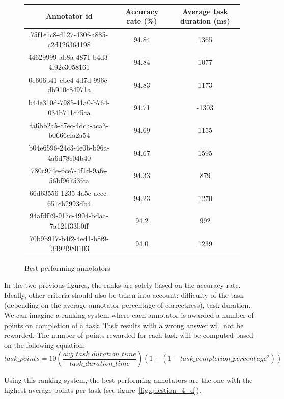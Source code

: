 \documentclass[letterpaper,12pt]{article}
\begin{document}
\renewcommand\thefigure{11}
\begin{figure}[hb] 
\centering
        \begin{tabular}{|ccc|} 
\hline
\multicolumn{1}{|c}{Annotator id} & \multicolumn{1}{c}{Accuracy rate (\%)} & \multicolumn{1}{c|}{Average task duration (ms)} \\
\hline
75f1e1c8-d127-430f-a885-c2d126364198 & 94.84 & 1365 \\
44629999-ab8a-4871-b4d3-4f92c3058161 & 94.84 & 1077 \\
0e606b41-ebe4-4d7d-996c-db910c84971a & 94.83 & 1173 \\
b44e310d-7985-41a0-b764-034b711c75ca & 94.71 & -1303 \\
fa6bb2a5-c7ec-4dca-aca3-b0666efa2a54 & 94.69 & 1155 \\
b04e6596-24c3-4e0b-b96a-4a6d78c04b40 & 94.67 & 1595 \\
780c974e-6ce7-4f1d-9afe-56bf96753fca & 94.33 & 879 \\
66d63556-1235-4a5e-accc-651cb2993db4 & 94.23 & 1270 \\
94afdf79-917c-4904-bdaa-7a121f33b0ff & 94.2 & 992 \\
70b9b917-b4f2-4ed1-b8f9-f3492f980103 & 94.0 & 1239 \\
\hline
\end{tabular}
        \caption{
                \label{fig:question_4_c}
                Best performing annotators
        }
\end{figure}

In the two previous figures, the ranks are solely based on the accuracy rate. Ideally, other criteria should also be taken into account: difficulty of the task (depending on the average annotator percentage of correctness), task duration.\newline
We can imagine a ranking system where each annotator is awarded a number of points on completion of a task. Task results with a wrong answer will not be rewarded. The number of points rewarded for each task will be computed based on the following equation:
\begin{equation}
\nonumber
task\_points = 10 (\frac{avg\_task\_duration\_time}{task\_duration\_time}) (1 + (1 - task\_completion\_percentage^{\mathrm{2}}))
\end{equation}

Using this ranking system, the best performing annotators are the one with the highest average points per task (see figure~\ref{fig:question_4_d}).
\end{document}
